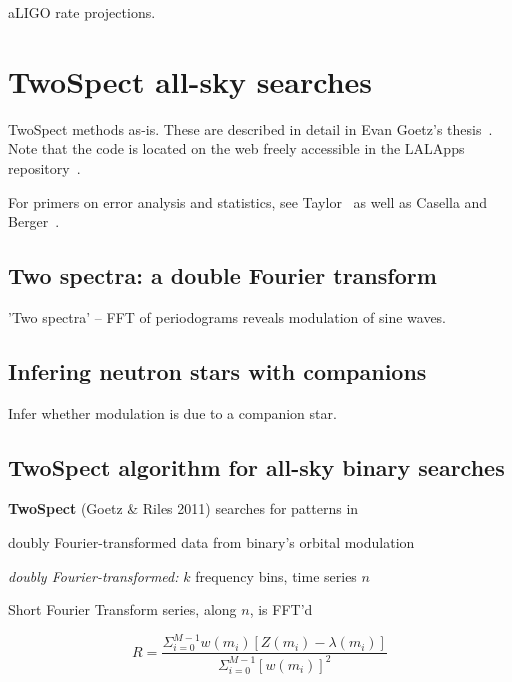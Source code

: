                 aLIGO rate projections.

        \section{TwoSpect all-sky searches}
        \label{all-sky}

            TwoSpect methods as-is. These are described in detail in Evan Goetz's thesis~\cite{GoetzThesis}. Note that the code is located on the web freely accessible in the LALApps repository~\cite{LALAPPSrepo}.

For primers on error analysis and statistics, see Taylor~\cite{taylor} as well as Casella and Berger~\cite{CasellaBerger2001}.

            \subsection{Two spectra: a double Fourier transform}
            \label{two_spectra}

                'Two spectra' -- FFT of periodograms reveals modulation of sine waves.

            \subsection{Infering neutron stars with companions}
            \label{inference}
 
                Infer whether modulation is due to a companion star.



\subsection{TwoSpect algorithm for all-sky binary searches}


\textbf{TwoSpect} (Goetz \& Riles 2011) searches for patterns in


doubly Fourier-transformed data from binary's orbital modulation


\emph{doubly Fourier-transformed:} $k$ frequency bins, time series
$n$


Short Fourier Transform series, along $n$, is FFT'd 


\[
R=\frac{\Sigma_{i=0}^{M-1}w(m_{i})[Z(m_{i})-\lambda(m_{i})]}{\Sigma_{i=0}^{M-1}[w(m_{i})]^{2}}
\]



